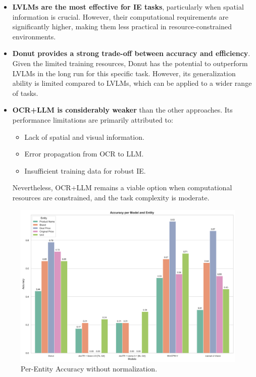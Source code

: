 \documentclass[11pt]{article}
\begin{document}
\begin{itemize}
    \item \textbf{LVLMs are the most effective for IE tasks}, particularly when spatial information is crucial. However, their computational requirements are significantly higher, making them less practical in resource-constrained environments.
    \item \textbf{Donut provides a strong trade-off between accuracy and efficiency}. Given the limited training resources, Donut has the potential to outperform LVLMs in the long run for this specific task. However, its generalization ability is limited compared to LVLMs, which can be applied to a wider range of tasks.
    \item \textbf{OCR+LLM is considerably weaker} than the other approaches. Its performance limitations are primarily attributed to:
    \begin{itemize}
        \item Lack of spatial and visual information.
        \item Error propagation from OCR to LLM.
        \item Insufficient training data for robust IE.
    \end{itemize}
    Nevertheless, OCR+LLM remains a viable option when computational resources are constrained, and the task complexity is moderate.
\end{itemize}

\begin{figure}[h!]
    \centering
    \includegraphics[width=0.8\linewidth]{figures/eval_final_acc_raw.png}
    \caption{Per-Entity Accuracy without normalization.}
    \label{fig:eval_final_acc_raw}
\end{figure}
\end{document}
